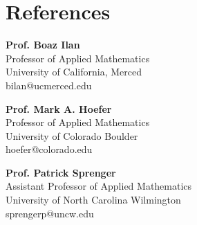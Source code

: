 \documentclass[letterpaper,10pt]{article} %
\begin{document}

\section{\color{headcol}References}
\vspace{6pt}
\noindent
  \begin{minipage}[t]{0.32\textwidth}\small\textbf{Prof. Boaz Ilan}\\[3pt] Professor of Applied Mathematics\\[2pt] University of California, Merced\\[2pt] bilan@ucmerced.edu\end{minipage}\hfill
  \begin{minipage}[t]{0.32\textwidth}\small\textbf{Prof. Mark A. Hoefer}\\[3pt] Professor of Applied Mathematics\\[2pt] University of Colorado Boulder\\[2pt] hoefer@colorado.edu\end{minipage}\hfill
  \begin{minipage}[t]{0.32\textwidth}\small\textbf{Prof. Patrick Sprenger}\\[3pt] Assistant Professor of Applied Mathematics\\[2pt] University of North Carolina Wilmington\\[2pt] sprengerp@uncw.edu\end{minipage}
\end{document}
